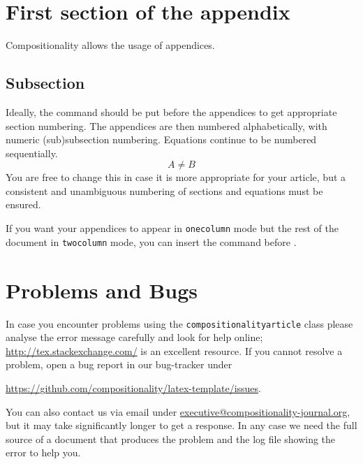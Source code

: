\documentclass[a4paper,onecolumn, superscriptaddress,10pt,accepted=2020-05-01,issue=1, volume=2, shorttitle=papers]{compositionalityarticle}
\begin{document}
\appendix

\section{First section of the appendix}
Compositionality allows the usage of appendices.

\subsection{Subsection}
Ideally, the command \texttt{\string\appendix} should be put before the appendices to get appropriate section numbering.
The appendices are then numbered alphabetically, with numeric (sub)subsection numbering.
Equations continue to be numbered sequentially.
\begin{equation}
  A \neq B
\end{equation}
You are free to change this in case it is more appropriate for your article, but a consistent and unambiguous numbering of sections and equations must be ensured.

If you want your appendices to appear in \texttt{onecolumn} mode but the rest of the document in \texttt{twocolumn} mode, you can insert the command \texttt{\string\onecolumn\string\newpage} before \texttt{\string\appendix}.   

\section{Problems and Bugs}
In case you encounter problems using the \texttt{compositionalityarticle} class please analyse the error message carefully and look for help online; \href{http://tex.stackexchange.com/}{http://tex.stackexchange.com/} is an excellent resource.
If you cannot resolve a problem,  open a bug report in our bug-tracker under 
\begin{center}
  \href{https://github.com/compositionality/issues}{https://github.com/compositionality/latex-template/issues}.
\end{center}

You can also contact us via email under \href{executive-board@compositionality-journal.org}{executive@compositionality-journal.org}, but it may take significantly longer to get a response.
In any case we need the full source of a document that produces the problem and the log file showing the error to help you.

\newpage
\end{document}

